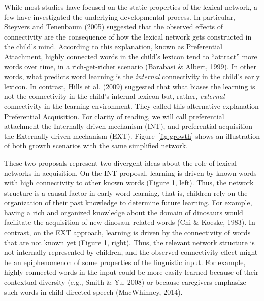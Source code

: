 \documentclass[english,floatsintext,man]{apa6}
\theoremstyle{definition}
\theoremstyle{definition}
\theoremstyle{definition}
\theoremstyle{remark}
\begin{document}
While most studies have focused on the static properties of the lexical
network, a few have investigated the underlying developmental process.
In particular, Steyvers and Tenenbaum (2005) suggested that the observed
effects of connectivity are the consequence of how the lexical network
gets constructed in the child's mind. According to this explanation,
known as Preferential Attachment, highly connected words in the child's
lexicon tend to \enquote{attract} more words over time, in a
rich-get-richer scenario (Barabasi \& Albert, 1999). In other words,
what predicts word learning is the \emph{internal} connectivity in the
child's early lexicon. In contrast, Hills et al. (2009) suggested that
what biases the learning is not the connectivity in the child's internal
lexicon but, rather, \emph{external} connectivity in the learning
environment. They called this alternative explanation Preferential
Acquisition. For clarity of reading, we will call preferential
attachment the Internally-driven mechanism (INT), and preferential
acquisition the Externally-driven mechanism (EXT).
Figure~\ref{fig:growth} shows an illustration of both growth scenarios
with the same simplified network.

These two proposals represent two divergent ideas about the role of
lexical networks in acquisition. On the INT proposal, learning is driven
by known words with high connectivity to other known words (Figure 1,
left). Thus, the network structure is a causal factor in early word
learning, that is, children rely on the organization of their past
knowledge to determine future learning. For example, having a rich and
organized knowledge about the domain of dinosaurs would facilitate the
acquisition of new dinosaur-related words (Chi \& Koeske, 1983). In
contrast, on the EXT approach, learning is driven by the connectivity of
words that are not known yet (Figure 1, right). Thus, the relevant
network structure is not internally represented by children, and the
observed connectivity effect might be an epiphenomenon of some
properties of the linguistic input. For example, highly connected words
in the input could be more easily learned because of their contextual
diversity (e.g., Smith \& Yu, 2008) or because caregivers emphasize such
words in child-directed speech (MacWhinney, 2014).
\end{document}
